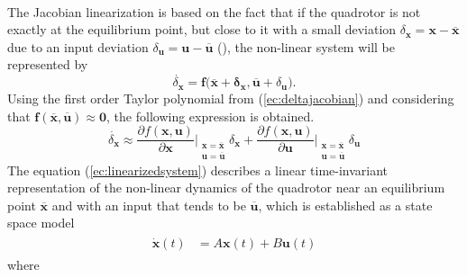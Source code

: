 \\
The Jacobian linearization is based on the fact that if the quadrotor is not exactly at the equilibrium point, but close to it with a small deviation $\delta_{\mathbf{x}} = \mathbf{x} - \overline{\mathbf{x}}$ due to an input deviation $\delta_{\mathbf{u}}= \mathbf{u} - \overline{\mathbf{u}}$ (\cite{RanjanVepa2016}), the non-linear system will be represented by
\begin{equation}
\label{ec:deltajacobian}
\dot{\delta_{\mathbf{x}}} =  \mathbf{f(\overline{x}+\delta_{\mathbf{x}},\overline{u}}+\delta_{\mathbf{u}}).
\end{equation}
Using the first order Taylor polynomial from (\ref{ec:deltajacobian}) and considering that $\mathbf{f(\overline{x},\overline{u})} \approx \mathbf{0}$, the following expression is obtained.
\begin{equation}
\label{ec:linearizedsystem}
\dot{\delta_{\mathbf{x}}} \approx 
\frac{\partial f(\mathbf{x},\mathbf{u})}{\partial \mathbf{x}}\Bigr|_{\substack{\mathbf{x}=\overline{\mathbf{x}}\\\mathbf{u}=\overline{\mathbf{u}}}} \delta_{\mathbf{x}} + \frac{\partial f(\mathbf{x},\mathbf{u})}{\partial \mathbf{u}}\Bigr|_{\substack{\mathbf{x}=\overline{\mathbf{x}}\\\mathbf{u}=\overline{\mathbf{u}}}} \delta_{\mathbf{u}}
\end{equation}
The equation (\ref{ec:linearizedsystem}) describes a linear time-invariant representation of the non-linear dynamics of the quadrotor near an equilibrium point $\overline{\mathbf{x}}$ and with an input that tends to be $\overline{\mathbf{u}}$, which is established as a state space model
\begin{align}
\begin{split}
\dot{\mathbf{x}}(t) & = A\mathbf{x}(t)+B\mathbf{u}(t)
\end{split}
\end{align}
where
